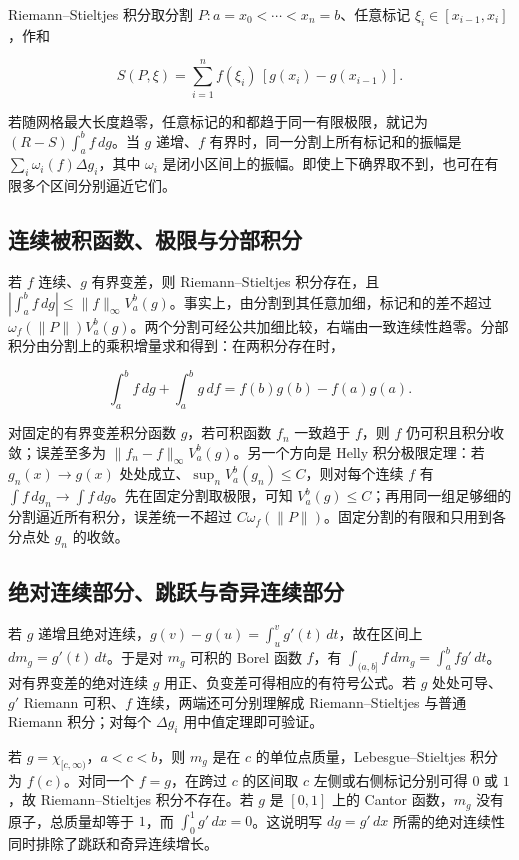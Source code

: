 \documentclass[11pt,a4paper]{article}
\begin{document}
Riemann--Stieltjes 积分取分割 \(P:a=x_0<\cdots<x_n=b\)、任意标记 \(\xi_i\in[x_{i-1},x_i]\)，作和

\[
S(P,\xi)=\sum_{i=1}^n f(\xi_i)\,[g(x_i)-g(x_{i-1})].
\]

若随网格最大长度趋零，任意标记的和都趋于同一有限极限，就记为 \((R\!-\!S)\int_a^b f\,dg\)。当 \(g\) 递增、\(f\) 有界时，同一分割上所有标记和的振幅是 \(\sum_i\omega_i(f)\Delta g_i\)，其中 \(\omega_i\) 是闭小区间上的振幅。即使上下确界取不到，也可在有限多个区间分别逼近它们。

\subsection*{连续被积函数、极限与分部积分}\label{ux8fdeux7eedux88abux79efux51fdux6570ux6781ux9650ux4e0eux5206ux90e8ux79efux5206}

若 \(f\) 连续、\(g\) 有界变差，则 Riemann--Stieltjes 积分存在，且 \(|\int_a^b f\,dg|\le\|f\|_\infty V_a^b(g)\)。事实上，由分割到其任意加细，标记和的差不超过 \(\omega_f(\|P\|)V_a^b(g)\)。两个分割可经公共加细比较，右端由一致连续性趋零。分部积分由分割上的乘积增量求和得到：在两积分存在时，

\[
\int_a^b f\,dg+\int_a^b g\,df=f(b)g(b)-f(a)g(a).
\]

对固定的有界变差积分函数 \(g\)，若可积函数 \(f_n\) 一致趋于 \(f\)，则 \(f\) 仍可积且积分收敛；误差至多为 \(\|f_n-f\|_\infty V_a^b(g)\)。另一个方向是 Helly 积分极限定理：若 \(g_n(x)\to g(x)\) 处处成立、\(\sup_n V_a^b(g_n)\le C\)，则对每个连续 \(f\) 有 \(\int f\,dg_n\to\int f\,dg\)。先在固定分割取极限，可知 \(V_a^b(g)\le C\)；再用同一组足够细的分割逼近所有积分，误差统一不超过 \(C\omega_f(\|P\|)\)。固定分割的有限和只用到各分点处 \(g_n\) 的收敛。

\subsection*{绝对连续部分、跳跃与奇异连续部分}\label{ux7eddux5bf9ux8fdeux7eedux90e8ux5206ux8df3ux8dc3ux4e0eux5947ux5f02ux8fdeux7eedux90e8ux5206}

若 \(g\) 递增且绝对连续，\(g(v)-g(u)=\int_u^v g'(t)\,dt\)，故在区间上 \(dm_g=g'(t)\,dt\)。于是对 \(m_g\) 可积的 Borel 函数 \(f\)，有 \(\int_{(a,b]}f\,dm_g=\int_a^b fg'\,dt\)。对有界变差的绝对连续 \(g\) 用正、负变差可得相应的有符号公式。若 \(g\) 处处可导、\(g'\) Riemann 可积、\(f\) 连续，两端还可分别理解成 Riemann--Stieltjes 与普通 Riemann 积分；对每个 \(\Delta g_i\) 用中值定理即可验证。

若 \(g=\chi_{[c,\infty)}\)，\(a<c<b\)，则 \(m_g\) 是在 \(c\) 的单位点质量，Lebesgue--Stieltjes 积分为 \(f(c)\)。对同一个 \(f=g\)，在跨过 \(c\) 的区间取 \(c\) 左侧或右侧标记分别可得 \(0\) 或 \(1\)，故 Riemann--Stieltjes 积分不存在。若 \(g\) 是 \([0,1]\) 上的 Cantor 函数，\(m_g\) 没有原子，总质量却等于 \(1\)，而 \(\int_0^1 g'\,dx=0\)。这说明写 \(dg=g'\,dx\) 所需的绝对连续性同时排除了跳跃和奇异连续增长。
\end{document}
